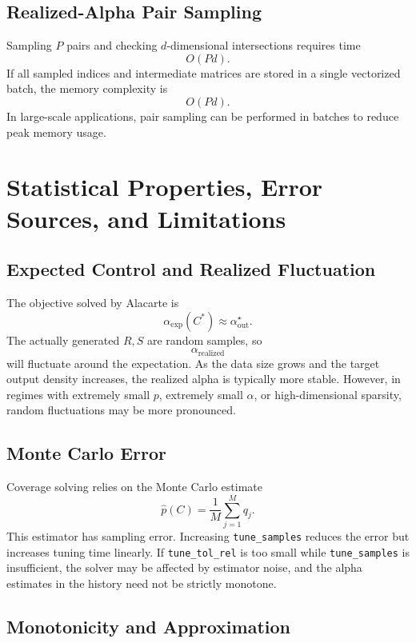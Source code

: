 \documentclass[11pt,a4paper]{article}
\newcommand{\code}[1]{\texttt{#1}}
\begin{document}
\subsection{Realized-Alpha Pair Sampling}

Sampling $P$ pairs and checking $d$-dimensional intersections requires time
\[
  O(Pd).
\]
If all sampled indices and intermediate matrices are stored in a single vectorized batch, the memory complexity is
\[
  O(Pd).
\]
In large-scale applications, pair sampling can be performed in batches to reduce peak memory usage.

\section{Statistical Properties, Error Sources, and Limitations}

\subsection{Expected Control and Realized Fluctuation}

The objective solved by Alacarte is
\[
  \alpha_{\mathrm{exp}}(C^*)
  \approx
  \alpha_{\mathrm{out}}^\star.
\]
The actually generated $R,S$ are random samples, so
\[
  \alpha_{\mathrm{realized}}
\]
will fluctuate around the expectation. As the data size grows and the target output density increases, the realized alpha is typically more stable. However, in regimes with extremely small $p$, extremely small $\alpha$, or high-dimensional sparsity, random fluctuations may be more pronounced.

\subsection{Monte Carlo Error}

Coverage solving relies on the Monte Carlo estimate
\[
  \widehat p(C)
  =
  \frac1M\sum_{j=1}^{M}q_j.
\]
This estimator has sampling error. Increasing \code{tune\_samples} reduces the error but increases tuning time linearly. If \code{tune\_tol\_rel} is too small while \code{tune\_samples} is insufficient, the solver may be affected by estimator noise, and the alpha estimates in the history need not be strictly monotone.

\subsection{Monotonicity and Approximation}
\end{document}

